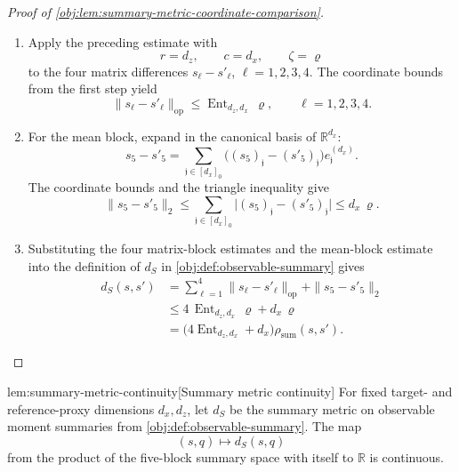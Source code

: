 \documentclass[11pt]{article}
\begin{document}
\begin{proof}[Proof of \cref{obj:lem:summary-metric-coordinate-comparison}]
\begin{enumerate}
\item Apply the preceding estimate with
\[
r=d_z,\qquad c=d_x,\qquad \zeta=\varrho
\]
to the four matrix differences \(s_\ell-s'_\ell\), \(\ell=1,2,3,4\).  The
coordinate bounds from the first step yield
\[
\|s_\ell-s'_\ell\|_{\mathrm{op}}
\le
\operatorname{Ent}_{d_z,d_x}\,\varrho,
\qquad \ell=1,2,3,4 .
\]

\item For the mean block, expand in the canonical basis of \(\mathbb R^{d_x}\):
\[
s_5-s'_5
=
\sum_{\mathfrak j\in[d_x]_0}
\bigl((s_5)_{\mathfrak j}-(s'_5)_{\mathfrak j}\bigr)e^{(d_x)}_{\mathfrak j}.
\]
The coordinate bounds and the triangle inequality give
\[
\|s_5-s'_5\|_2
\le
\sum_{\mathfrak j\in[d_x]_0}
\bigl|(s_5)_{\mathfrak j}-(s'_5)_{\mathfrak j}\bigr|
\le
d_x\,\varrho .
\]

\item Substituting the four matrix-block estimates and the mean-block estimate
into the definition of \(d_S\) in \cref{obj:def:observable-summary} gives
\[
\begin{aligned}
d_S(s,s')
&=
\sum_{\ell=1}^{4}\|s_\ell-s'_\ell\|_{\mathrm{op}}
+\|s_5-s'_5\|_2 \\
&\le
4\,\operatorname{Ent}_{d_z,d_x}\,\varrho+d_x\,\varrho \\
&=
\bigl(4\operatorname{Ent}_{d_z,d_x}+d_x\bigr)
\rho_{\mathrm{sum}}(s,s') .
\end{aligned}
\]
\end{enumerate}
\end{proof}

\begin{lemmav}{lem:summary-metric-continuity}[Summary metric continuity]
For fixed target- and reference-proxy dimensions \(d_x,d_z\), let \(d_S\) be the summary metric on observable moment summaries from \cref{obj:def:observable-summary}. The map
\[
(s,q)\longmapsto d_S(s,q)
\]
from the product of the five-block summary space with itself to \(\mathbb R\) is continuous.
\end{lemmav}
\end{document}
